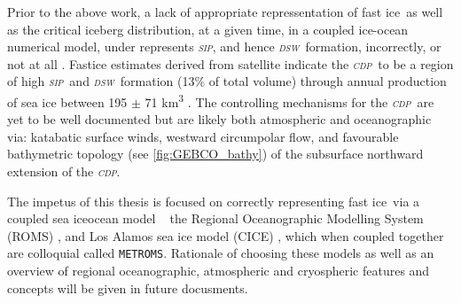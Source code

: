 \documentclass[11pt,a4paper]{article}
\newcommand{\sip}{\textit{\textsc{sip}}} %
\newcommand{\dsw}{\textit{\textsc{{dsw}}}} %
\newcommand{\cdp}{\textit{\textsc{{cdp}}}} %
\newcommand{\fastice}{fast ice}
\begin{document}
Prior to the above work, a lack of appropriate repressentation of \fastice~as
well as the critical iceberg distribution, at a given time, in a coupled
ice-ocean numerical model, under represents \sip, and hence \dsw~formation,
incorrectly, or not at all \citep{Nakayama2014,Liu2017}. Fast\textendash ice estimates
derived from satellite indicate the \cdp~to be a region of high \sip~and \dsw~formation (13\% of total volume) through annual production of sea ice between 195 $\pm$ 71 \si{\kilo\meter\cubed}
\citep{Ohshima2013,Tamura2016}. The controlling mechanisms for the \cdp~are yet to be well documented but are likely both atmospheric and oceanographic via: katabatic surface winds, westward circumpolar flow, and favourable bathymetric
topology (see \ref{fig:GEBCO_bathy}) of the subsurface northward extension of the \cdp.

The impetus of this thesis is focused on correctly representing \fastice~via a coupled sea ice\textendash ocean model \textemdash~ the Regional Oceanographic Modelling System (ROMS) \citep{Shchepetkin2005}, and Los Alamos sea ice model (CICE) \citep{Hunke2010,Hunke2010a}, which when coupled together are colloquial called \texttt{METROMS}. Rationale of choosing these models as well as an overview of regional oceanographic, atmospheric and cryospheric features and concepts will be given in future docusments. 

\end{document}
